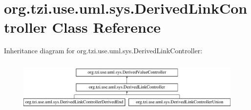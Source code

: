 \hypertarget{classorg_1_1tzi_1_1use_1_1uml_1_1sys_1_1_derived_link_controller}{\section{org.\-tzi.\-use.\-uml.\-sys.\-Derived\-Link\-Controller Class Reference}
\label{classorg_1_1tzi_1_1use_1_1uml_1_1sys_1_1_derived_link_controller}
}
Inheritance diagram for org.\-tzi.\-use.\-uml.\-sys.\-Derived\-Link\-Controller\-:\begin{figure}[H]
\begin{center}
\leavevmode
\includegraphics[height=2.625000cm]{classorg_1_1tzi_1_1use_1_1uml_1_1sys_1_1_derived_link_controller}
\end{center}
\end{figure}
